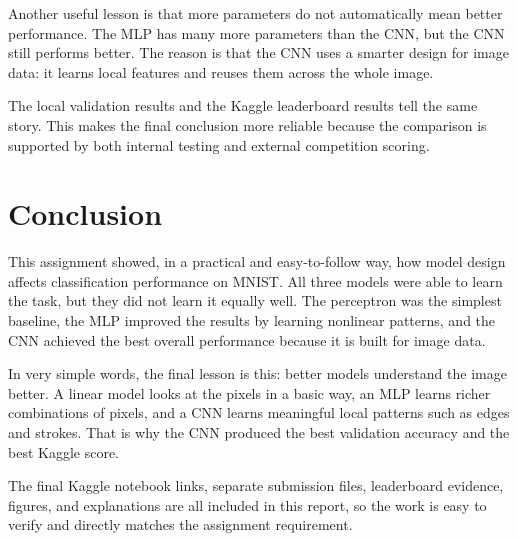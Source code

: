 \documentclass[11pt]{article}
\begin{document}
Another useful lesson is that more parameters do not automatically mean better performance. The MLP has many more parameters than the CNN, but the CNN still performs better. The reason is that the CNN uses a smarter design for image data: it learns local features and reuses them across the whole image.

The local validation results and the Kaggle leaderboard results tell the same story. This makes the final conclusion more reliable because the comparison is supported by both internal testing and external competition scoring.

\section{Conclusion}

This assignment showed, in a practical and easy-to-follow way, how model design affects classification performance on MNIST. All three models were able to learn the task, but they did not learn it equally well. The perceptron was the simplest baseline, the MLP improved the results by learning nonlinear patterns, and the CNN achieved the best overall performance because it is built for image data.

In very simple words, the final lesson is this: better models understand the image better. A linear model looks at the pixels in a basic way, an MLP learns richer combinations of pixels, and a CNN learns meaningful local patterns such as edges and strokes. That is why the CNN produced the best validation accuracy and the best Kaggle score.

The final Kaggle notebook links, separate submission files, leaderboard evidence, figures, and explanations are all included in this report, so the work is easy to verify and directly matches the assignment requirement.
\end{document}
